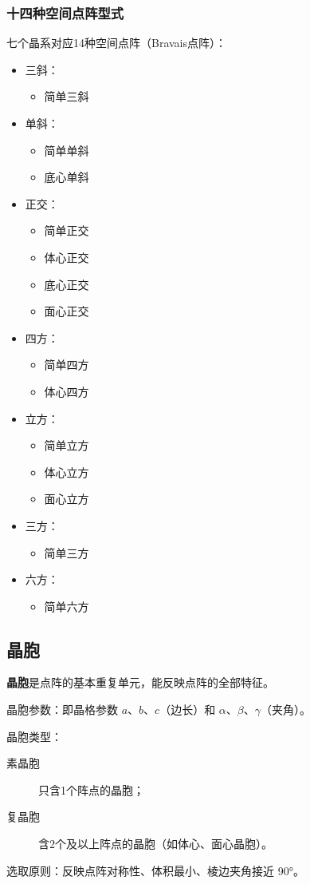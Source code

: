 \subsubsection{十四种空间点阵型式}
七个晶系对应14种空间点阵（Bravais点阵）：
\begin{itemize}
    \item 三斜：
        \begin{itemize}
            \item 简单三斜
        \end{itemize}
    \item 单斜：
        \begin{itemize}
            \item 简单单斜
            \item 底心单斜
        \end{itemize}
    \item 正交：
        \begin{itemize}
            \item 简单正交
            \item 体心正交
            \item 底心正交
            \item 面心正交
        \end{itemize}
    \item 四方：
        \begin{itemize}
            \item 简单四方
            \item 体心四方
        \end{itemize}
    \item 立方：
        \begin{itemize}
            \item 简单立方
            \item 体心立方
            \item 面心立方
        \end{itemize}
    \item 三方：
        \begin{itemize}
            \item 简单三方
        \end{itemize}
    \item 六方：
        \begin{itemize}
            \item 简单六方
        \end{itemize}
\end{itemize}

\subsection{晶胞}
\textbf{晶胞}是点阵的基本重复单元，能反映点阵的全部特征。

晶胞参数：即晶格参数 $a$、$b$、$c$（边长）和 $\alpha$、$\beta$、$\gamma$（夹角）。

晶胞类型：
\begin{description}
    \item[素晶胞] 只含1个阵点的晶胞；
    \item[复晶胞] 含2个及以上阵点的晶胞（如体心、面心晶胞）。
\end{description}

选取原则：反映点阵对称性、体积最小、棱边夹角接近 \ang{90}。